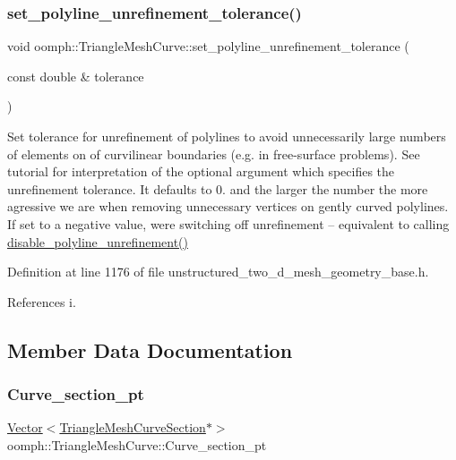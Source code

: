 \subsubsection{\texorpdfstring{set\+\_\+polyline\+\_\+unrefinement\+\_\+tolerance()}{set\_polyline\_unrefinement\_tolerance()}}
{\footnotesize\ttfamily void oomph\+::\+Triangle\+Mesh\+Curve\+::set\+\_\+polyline\+\_\+unrefinement\+\_\+tolerance (\begin{DoxyParamCaption}\item[{const double \&}]{tolerance }\end{DoxyParamCaption})\hspace{0.3cm}{\ttfamily [inline]}}



Set tolerance for unrefinement of polylines to avoid unnecessarily large numbers of elements on of curvilinear boundaries (e.\+g. in free-\/surface problems). See tutorial for interpretation of the optional argument which specifies the unrefinement tolerance. It defaults to 0. and the larger the number the more agressive we are when removing unnecessary vertices on gently curved polylines. If set to a negative value, we\textquotesingle{}re switching off unrefinement -- equivalent to calling \hyperlink{classoomph_1_1TriangleMeshCurve_a43036d1d42da58555ebe9b9ad2036a9c}{disable\+\_\+polyline\+\_\+unrefinement()} 



Definition at line 1176 of file unstructured\+\_\+two\+\_\+d\+\_\+mesh\+\_\+geometry\+\_\+base.\+h.



References i.



\subsection{Member Data Documentation}
\mbox{\label{classoomph_1_1TriangleMeshCurve_a5834ebf68c639d6d2b2b8260da5270fe}} 
\subsubsection{\texorpdfstring{Curve\+\_\+section\+\_\+pt}{Curve\_section\_pt}}
{\footnotesize\ttfamily \hyperlink{classoomph_1_1Vector}{Vector}$<$\hyperlink{classoomph_1_1TriangleMeshCurveSection}{Triangle\+Mesh\+Curve\+Section}$\ast$$>$ oomph\+::\+Triangle\+Mesh\+Curve\+::\+Curve\+\_\+section\+\_\+pt\hspace{0.3cm}{\ttfamily [protected]}}



